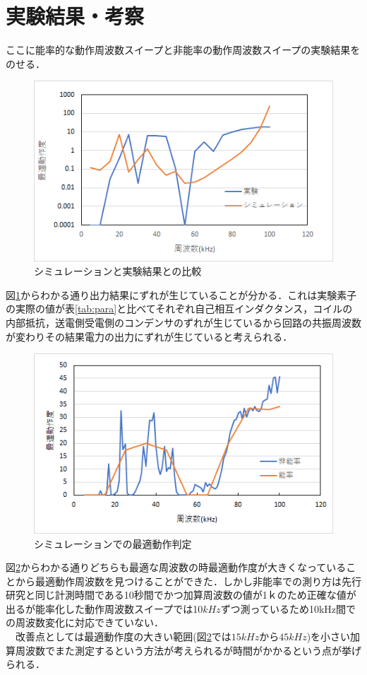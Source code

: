 \documentclass[10pt,a4paper,twocolumn]{jarticle}
\begin{document}
\section{実験結果・考察}
ここに能率的な動作周波数スイープと非能率の動作周波数スイープの実験結果をのせる．
\begin{figure}[h]
	\centering
	\includegraphics[scale=0.4]{simuhikaku.png}
	\caption{シミュレーションと実験結果との比較}
	\label{fig:simu-zitu}
\end{figure}
図\ref{fig:simu-zitu}からわかる通り出力結果にずれが生じていることが分かる．これは実験素子の実際の値が表\ref{tab:para}と比べてそれぞれ自己相互インダクタンス，コイルの内部抵抗，送電側受電側のコンデンサのずれが生じているから回路の共振周波数が変わりその結果電力の出力にずれが生じていると考えられる．
\vspace{\baselineskip}
\begin{figure}[h]
	\centering
	\includegraphics[scale=0.4]{nouritu-hinouritu.png}
	\caption{シミュレーションでの最適動作判定}
	\label{fig:nou-hinou}
\end{figure}
図\ref{fig:nou-hinou}からわかる通りどちらも最適な周波数の時最適動作度が大きくなっていることから最適動作周波数を見つけることができた．しかし非能率での測り方は先行研究と同じ計測時間である10秒間でかつ加算周波数の値が1ｋのため正確な値が出るが能率化した動作周波数スイープでは10$kHz$ずつ測っているため10kHz間での周波数変化に対応できていない．
\\　改善点としては最適動作度の大きい範囲(図\ref{fig:nou-hinou}では$15kHzから45kHz$)を小さい加算周波数でまた測定するという方法が考えられるが時間がかかるという点が挙げられる．
\end{document}
